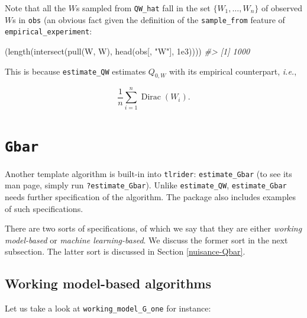 \documentclass[
  11pt,
  openright,twoside]{book}
\newenvironment{Shaded}{\begin{snugshade}}{\end{snugshade}}
\newcommand{\CommentTok}[1]{\textcolor[rgb]{0.56,0.35,0.01}{\textit{#1}}}
\newcommand{\FloatTok}[1]{\textcolor[rgb]{0.00,0.00,0.81}{#1}}
\newcommand{\FunctionTok}[1]{\textcolor[rgb]{0.00,0.00,0.00}{#1}}
\newcommand{\NormalTok}[1]{#1}
\newcommand{\StringTok}[1]{\textcolor[rgb]{0.31,0.60,0.02}{#1}}
\DeclareMathOperator{\Dirac}{Dirac}
\theoremstyle{definition}
\theoremstyle{definition}
\theoremstyle{definition}
\theoremstyle{definition}
\theoremstyle{remark}
\begin{document}
Note that all the \(W\)s sampled from \texttt{QW\_hat} fall in the set \(\{W_{1}, \ldots, W_{n}\}\) of observed \(W\)s in \texttt{obs} (an obvious fact given the definition of
the \texttt{sample\_from} feature of \texttt{empirical\_experiment}:

\begin{Shaded}
\begin{Highlighting}[]
\NormalTok{(}\FunctionTok{length}\NormalTok{(}\FunctionTok{intersect}\NormalTok{(}\FunctionTok{pull}\NormalTok{(W, W), }\FunctionTok{head}\NormalTok{(obs[, }\StringTok{"W"}\NormalTok{], }\FloatTok{1e3}\NormalTok{))))}
\CommentTok{\#\textgreater{} [1] 1000}
\end{Highlighting}
\end{Shaded}

This is because \texttt{estimate\_QW} estimates \(Q_{0,W}\) with its empirical
counterpart, \emph{i.e.},

\begin{equation*}\frac{1}{n} \sum_{i=1}^{n} \Dirac(W_{i}).\end{equation*}

\hypertarget{nuisance-Gbar}{%
\section{\texorpdfstring{\texttt{Gbar}}{Gbar}}\label{nuisance-Gbar}}

Another template algorithm is built-in into \texttt{tlrider}: \texttt{estimate\_Gbar} (to see
its man page, simply run \texttt{?estimate\_Gbar}). Unlike \texttt{estimate\_QW},
\texttt{estimate\_Gbar} needs further specification of the algorithm. The package also
includes examples of such specifications.

There are two sorts of specifications, of which we say that they are either
\emph{working model-based} or \emph{machine learning-based}. We discuss the former sort
in the next subsection. The latter sort is discussed in Section
\ref{nuisance-Qbar}.

\hypertarget{logis-loss}{%
\subsection{Working model-based algorithms}\label{logis-loss}}


Let us take a look at \texttt{working\_model\_G\_one} for instance:
\end{document}
